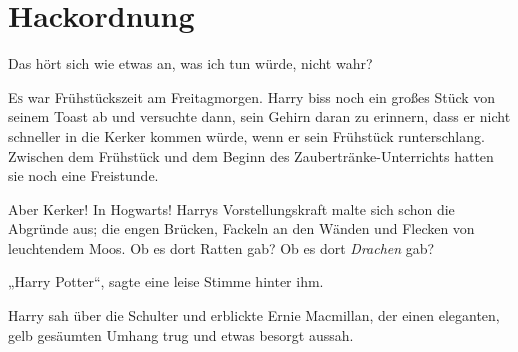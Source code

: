 \chapter{Hackordnung}

\begin{chapterOpeningQuote}
Das hört sich wie etwas an, was ich tun würde, nicht wahr?
\end{chapterOpeningQuote}

\lettrine{E}{s} war Frühstückszeit am Freitagmorgen. Harry biss noch ein großes Stück von seinem Toast ab und versuchte dann, sein Gehirn daran zu erinnern, dass er nicht schneller in die Kerker kommen würde, wenn er sein Frühstück runterschlang. Zwischen dem Frühstück und dem Beginn des Zaubertränke-Unterrichts hatten sie noch eine Freistunde.

Aber Kerker! In Hogwarts! Harrys Vorstellungskraft malte sich schon die Abgründe aus; die engen Brücken, Fackeln an den Wänden und Flecken von leuchtendem Moos. Ob es dort Ratten gab? Ob es dort \emph{Drachen} gab?

„Harry Potter“, sagte eine leise Stimme hinter ihm.

Harry sah über die Schulter und erblickte Ernie Macmillan, der einen eleganten, gelb gesäumten Umhang trug und etwas besorgt aussah.

